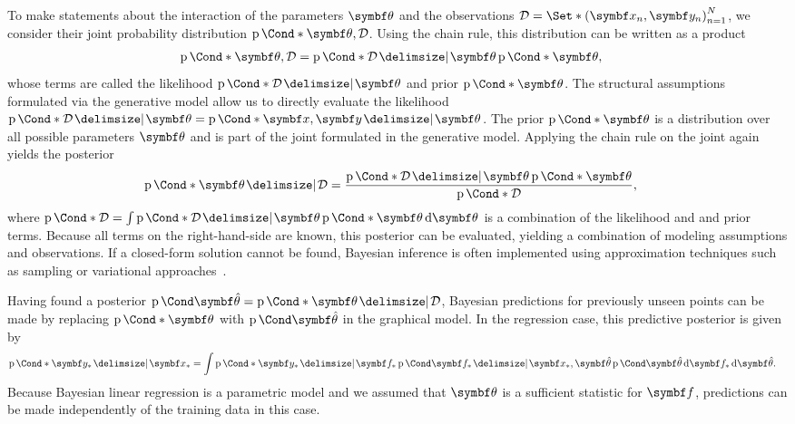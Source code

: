 To make statements about the interaction of the parameters $\mat{\theta}$ and the observations $\Dc = \Set*{(\mat{x}_n, \mat{y}_n)}_{n=1}^N$, we consider their joint probability distribution $\Prob*{\mat{\theta}, \Dc}$.
Using the chain rule, this distribution can be written as a product
\begin{align}
    \Prob*{\mat{\theta}, \Dc} &= \Prob*{\Dc \given \mat{\theta}}\Prob*{\mat{\theta}},
\end{align}
whose terms are called the likelihood $\Prob*{\Dc \given \mat{\theta}}$ and prior $\Prob*{\mat{\theta}}$.
The structural assumptions formulated via the generative model allow us to directly evaluate the likelihood $\Prob*{\Dc \given \mat{\theta}} = \Prob*{\mat{x}, \mat{y} \given \mat{\theta}}$.
The prior $\Prob*{\mat{\theta}}$ is a distribution over all possible parameters $\mat{\theta}$ and is part of the joint formulated in the generative model.
Applying the chain rule on the joint again yields the posterior
\begin{align}
    \Prob*{\mat{\theta} \given \Dc}
    &= \frac{\Prob*{\Dc \given \mat{\theta}}\Prob*{\mat{\theta}}}{\Prob*{\Dc}},
\end{align}
where $\Prob*{\Dc} = \int \Prob*{\Dc \given \mat{\theta}} \Prob*{\mat{\theta}} \diff \mat{\theta}$ is a combination of the likelihood and and prior terms.
Because all terms on the right-hand-side are known, this posterior can be evaluated, yielding a combination of modeling assumptions and observations.
If a closed-form solution cannot be found, Bayesian inference is often implemented using approximation techniques such as sampling or variational approaches~\parencite{bishop_christoph_pattern_2007}.

Having found a posterior $\Prob{\mat{\hat{\theta}}} = \Prob*{\mat{\theta} \given \Dc}$, Bayesian predictions for previously unseen points can be made by replacing $\Prob*{\mat{\theta}}$ with $\Prob{\mat{\hat{\theta}}}$ in the graphical model.
In the regression case, this predictive posterior is given by
\begin{align}
    \Prob*{\mat{y}_\ast \given \mat{x}_\ast} &= \int \Prob*{\mat{y}_\ast \given \mat{f}_\ast} \Prob{\mat{f}_\ast \given \mat{x}_\ast, \mat{\hat{\theta}}} \Prob{\mat{\hat{\theta}}} \diff \mat{f}_\ast \diff \mat{\hat{\theta}}.
\end{align}
Because Bayesian linear regression is a parametric model and we assumed that $\mat{\theta}$ is a sufficient statistic for $\mat{f}$, predictions can be made independently of the training data in this case.

